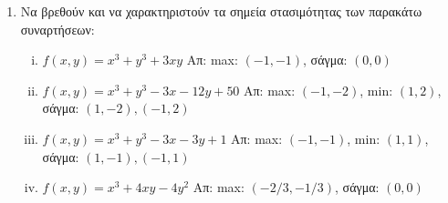 


\everymath{\displaystyle}






\begin{center}
\end{center}

\vspace{\baselineskip}


\begin{enumerate}
  \item Να βρεθούν και να χαρακτηριστούν τα σημεία στασιμότητας των παρακάτω συναρτήσεων:
    \begin{enumerate}[i)]
      \item $ f(x,y) = x^{3} + y^{3} + 3xy $ 
        \hfill Απ: max: $(-1,-1)  $, σάγμα: $ (0,0) $
      \item $ f(x,y) = x^{3} + y^{3} - 3x -12y + 50 $ 
        \hfill Απ: max: $ (-1,-2)$, min: $ (1,2) $, 
        σάγμα: $ (1,-2), (-1,2) $
      \item $ f(x,y) = x^{3} + y^{3} -3x -3y + 1 $ 
        \hfill Απ: max: $(-1,-1)  $, min: $ (1,1) $,
        σάγμα: $ (1,-1), (-1,1) $
      \item $ f(x,y) = x^{3} + 4xy -4y^{2} $ 
        \hfill Απ: max: $ (-2/3, -1/3)  $, σάγμα: $ (0,0) $
    \end{enumerate}


\end{enumerate}
